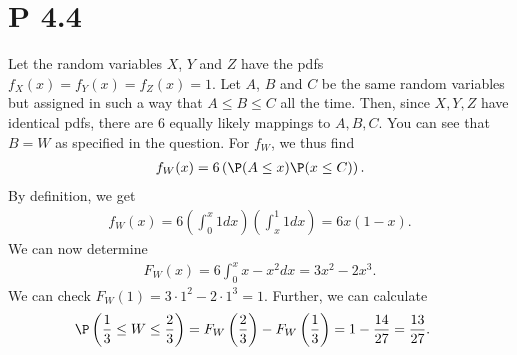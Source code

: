 \documentclass{article}
\begin{document}
\section*{P 4.4}


Let the random variables $X$, $Y$ and $Z$ have
the pdfs $f_X(x)=f_Y(x)=f_Z(x)=1$. Let $A$, $B$ and $C$
be the same random variables but assigned in such a way that
$A\leq B\leq C$ all the time. Then, since $X,Y,Z$ have identical pdfs,
there are $6$ equally likely mappings to $A,B,C$.
You can see that $B=W$ as specified in the question. For $f_W$,
we thus find
\begin{align*}
	f_W(x) = 6\left(\P(A \leq x)\P(x \leq C)\right).
\end{align*}
By definition, we get
\begin{align*}
	f_W(x) = 6\left(\int_0^x 1dx\right)\left(\int_x^1 1dx\right) = 6x(1-x).
\end{align*}
We can now determine
\begin{align*}
	F_W(x) = 6\int_0^x x - x^2 dx = 3x^2-2x^3.
\end{align*}
We can check $F_W(1) = 3\cdot 1^2 - 2 \cdot 1^3 = 1$. Further, we can
calculate
\begin{align*}
	\P\left(\frac{1}{3}\leq W \leq \frac{2}{3}\right)
	 & = F_W\left(\frac{2}{3}\right) - F_W\left(\frac{1}{3}\right)
	= 1 - \frac{14}{27} = \frac{13}{27}.
\end{align*}
\end{document}
